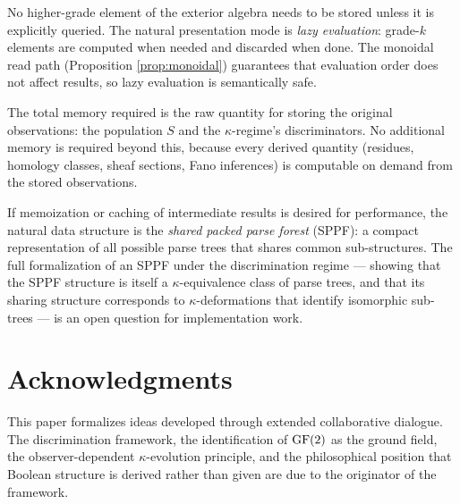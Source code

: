 No higher-grade element of the exterior algebra needs to
be stored unless it is explicitly queried. The natural
presentation mode is \emph{lazy evaluation}: grade-$k$
elements are computed when needed and discarded when done.
The monoidal read path (Proposition \ref{prop:monoidal})
guarantees that evaluation order does not affect results,
so lazy evaluation is semantically safe.

The total memory required is the raw quantity for storing
the original observations: the population $S$ and the
$\kappa$-regime's discriminators. No additional memory is
required beyond this, because every derived quantity
(residues, homology classes, sheaf sections, Fano
inferences) is computable on demand from the stored
observations.

If memoization or caching of intermediate results is
desired for performance, the natural data structure is
the \emph{shared packed parse forest} (SPPF): a compact
representation of all possible parse trees that shares
common sub-structures. The full formalization of an SPPF
under the discrimination regime --- showing that the SPPF
structure is itself a $\kappa$-equivalence class of parse
trees, and that its sharing structure corresponds to
$\kappa$-deformations that identify isomorphic sub-trees
--- is an open question for implementation work.

\section*{Acknowledgments}

This paper formalizes ideas developed through extended collaborative
dialogue. The discrimination framework, the identification of
$\operatorname{GF}(2)$ as the ground field, the observer-dependent $\kappa$-evolution
principle, and the philosophical position that Boolean structure
is derived rather than given are due to the originator of the
framework.

